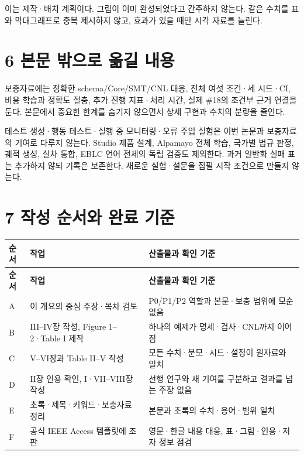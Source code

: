 \documentclass[11pt,a4paper]{article}
\begin{document}
이는 제작·배치 계획이다. 그림이 이미 완성되었다고 간주하지 않는다. 같은 수치를 표와 막대그래프로 중복 제시하지 않고, 효과가 있을 때만 시각 자료를 늘린다.\par

\section*{6 본문 밖으로 옮길 내용}

보충자료에는 정확한 schema/Core/SMT/CNL 대응, 전체 여섯 조건·세 시드·CI, 비용 학습과 정확도 절충, 추가 진행 지표·처리 시간, 실제 \#18의 조건부 근거 연결을 둔다. 본문에서 중요한 한계를 숨기지 않으면서 상세 구현과 수치의 분량을 줄인다.\par

테스트 생성·행동 테스트·실행 중 모니터링·오류 주입 실험은 이번 논문과 보충자료의 기여로 다루지 않는다. Studio 제품 설계, Alpamayo 전체 학습, 국가별 법규 판정, 궤적 생성, 실차 통합, EBLC 언어 전체의 독립 검증도 제외한다. 과거 일반화 실패 표는 추가하지 않되 기록은 보존한다. 새로운 실험·설문을 집필 시작 조건으로 만들지 않는다.\par

\section*{7 작성 순서와 완료 기준}

\begingroup\small
\begin{longtable}{@{}>{\raggedright\arraybackslash}p{}>{\raggedright\arraybackslash}p{}>{\raggedright\arraybackslash}p{}@{}}
\toprule
\textbf{순서} & \textbf{작업} & \textbf{산출물과 확인 기준} \\
\midrule\endfirsthead
\toprule
\textbf{순서} & \textbf{작업} & \textbf{산출물과 확인 기준} \\
\midrule\endhead
\bottomrule\endfoot
A & 이 개요의 중심 주장·목차 검토 & P0/P1/P2 역할과 본문·보충 범위에 모순 없음 \\
B & III–IV장 작성, Figure 1–2·Table I 제작 & 하나의 예제가 명세·검사·CNL까지 이어짐 \\
C & V–VI장과 Table II–V 작성 & 모든 수치·분모·시드·설정이 원자료와 일치 \\
D & II장 인용 확인, I·VII–VIII장 작성 & 선행 연구와 새 기여를 구분하고 결과를 넘는 주장 없음 \\
E & 초록·제목·키워드·보충자료 정리 & 본문과 초록의 수치·용어·범위 일치 \\
F & 공식 IEEE Access 템플릿에 조판 & 영문·한글 내용 대응, 표·그림·인용·저자 정보 점검 \\
\end{longtable}
\endgroup
\end{document}
